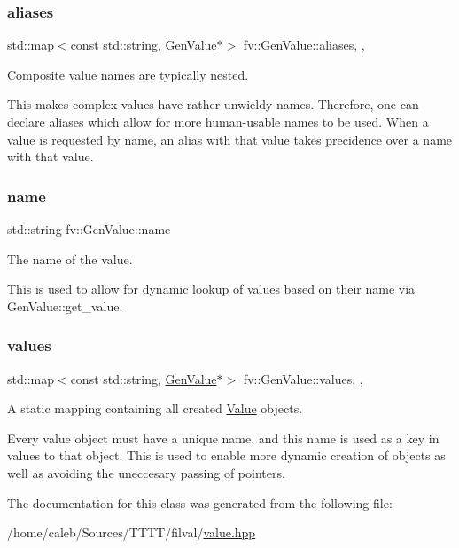 \subsubsection{\texorpdfstring{aliases}{aliases}}
{\footnotesize\ttfamily std\+::map$<$const std\+::string, \hyperlink{classfv_1_1GenValue}{Gen\+Value}$\ast$$>$ fv\+::\+Gen\+Value\+::aliases\hspace{0.3cm}{\ttfamily [inline]}, {\ttfamily [static]}, {\ttfamily [protected]}}



Composite value names are typically nested. 

This makes complex values have rather unwieldy names. Therefore, one can declare aliases which allow for more human-\/usable names to be used. When a value is requested by name, an alias with that value takes precidence over a name with that value. \hypertarget{classfv_1_1GenValue_a610f89ee441eaad4c9e78f74d6bde93b}{}\label{classfv_1_1GenValue_a610f89ee441eaad4c9e78f74d6bde93b} 
\subsubsection{\texorpdfstring{name}{name}}
{\footnotesize\ttfamily std\+::string fv\+::\+Gen\+Value\+::name\hspace{0.3cm}{\ttfamily [private]}}



The name of the value. 

This is used to allow for dynamic lookup of values based on their name via Gen\+Value\+::get\+\_\+value. \hypertarget{classfv_1_1GenValue_abbb57abc392c44d1f7ad5e7e74a75297}{}\label{classfv_1_1GenValue_abbb57abc392c44d1f7ad5e7e74a75297} 
\subsubsection{\texorpdfstring{values}{values}}
{\footnotesize\ttfamily std\+::map$<$const std\+::string, \hyperlink{classfv_1_1GenValue}{Gen\+Value}$\ast$$>$ fv\+::\+Gen\+Value\+::values\hspace{0.3cm}{\ttfamily [inline]}, {\ttfamily [static]}, {\ttfamily [protected]}}



A static mapping containing all created \hyperlink{classfv_1_1Value}{Value} objects. 

Every value object must have a unique name, and this name is used as a key in values to that object. This is used to enable more dynamic creation of objects as well as avoiding the uneccesary passing of pointers. 

The documentation for this class was generated from the following file\+:\begin{DoxyCompactItemize}
\item 
/home/caleb/\+Sources/\+T\+T\+T\+T/filval/\hyperlink{value_8hpp}{value.\+hpp}\end{DoxyCompactItemize}
